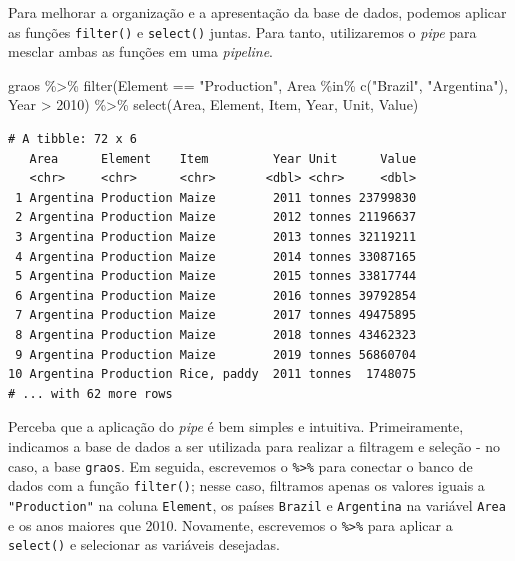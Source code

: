 \documentclass[
  brazilian,
]{book}
\newenvironment{Shaded}{\begin{snugshade}}{\end{snugshade}}
\newcommand{\DecValTok}[1]{\textcolor[rgb]{0.00,0.00,0.81}{#1}}
\newcommand{\FunctionTok}[1]{\textcolor[rgb]{0.00,0.00,0.00}{#1}}
\newcommand{\NormalTok}[1]{#1}
\newcommand{\SpecialCharTok}[1]{\textcolor[rgb]{0.00,0.00,0.00}{#1}}
\newcommand{\StringTok}[1]{\textcolor[rgb]{0.31,0.60,0.02}{#1}}
\begin{document}
Para melhorar a organização e a apresentação da base de dados, podemos aplicar as funções \texttt{filter()} e \texttt{select()} juntas. Para tanto, utilizaremos o \emph{pipe} para mesclar ambas as funções em uma \emph{pipeline}.

\begin{Shaded}
\begin{Highlighting}[]
\NormalTok{graos }\SpecialCharTok{\%\textgreater{}\%} 
  \FunctionTok{filter}\NormalTok{(Element }\SpecialCharTok{==} \StringTok{"Production"}\NormalTok{,}
\NormalTok{         Area }\SpecialCharTok{\%in\%} \FunctionTok{c}\NormalTok{(}\StringTok{"Brazil"}\NormalTok{, }\StringTok{"Argentina"}\NormalTok{),}
\NormalTok{         Year }\SpecialCharTok{\textgreater{}} \DecValTok{2010}\NormalTok{) }\SpecialCharTok{\%\textgreater{}\%} 
  \FunctionTok{select}\NormalTok{(Area, Element, Item, Year, Unit, Value)}
\end{Highlighting}
\end{Shaded}

\begin{verbatim}
# A tibble: 72 x 6
   Area      Element    Item         Year Unit      Value
   <chr>     <chr>      <chr>       <dbl> <chr>     <dbl>
 1 Argentina Production Maize        2011 tonnes 23799830
 2 Argentina Production Maize        2012 tonnes 21196637
 3 Argentina Production Maize        2013 tonnes 32119211
 4 Argentina Production Maize        2014 tonnes 33087165
 5 Argentina Production Maize        2015 tonnes 33817744
 6 Argentina Production Maize        2016 tonnes 39792854
 7 Argentina Production Maize        2017 tonnes 49475895
 8 Argentina Production Maize        2018 tonnes 43462323
 9 Argentina Production Maize        2019 tonnes 56860704
10 Argentina Production Rice, paddy  2011 tonnes  1748075
# ... with 62 more rows
\end{verbatim}

Perceba que a aplicação do \emph{pipe} é bem simples e intuitiva. Primeiramente, indicamos a base de dados a ser utilizada para realizar a filtragem e seleção - no caso, a base \texttt{graos}. Em seguida, escrevemos o \texttt{\%\textgreater{}\%} para conectar o banco de dados com a função \texttt{filter()}; nesse caso, filtramos apenas os valores iguais a \texttt{"Production"} na coluna \texttt{Element}, os países \texttt{Brazil} e \texttt{Argentina} na variável \texttt{Area} e os anos maiores que 2010. Novamente, escrevemos o \texttt{\%\textgreater{}\%} para aplicar a \texttt{select()} e selecionar as variáveis desejadas.
\end{document}
